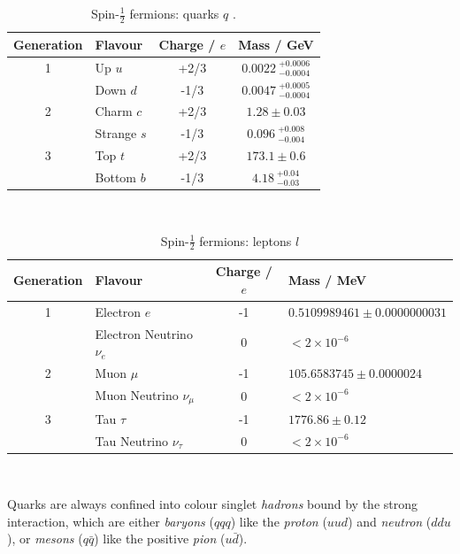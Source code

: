		{
		\setlength{\extrarowheight}{5pt}
		\begin{table}[ht]
			\caption[Properties of Spin-$\frac{1}{2}$ quarks]{Spin-$\frac{1}{2}$ fermions: quarks $q$ \cite{pdg}.}
			\label{t:tab:quark}
			\medskip
			\centering
			\begin{tabular}{clcc}\toprule
				Generation & Flavour & Charge / $e$ & Mass / GeV \\\midrule
				1    &     Up $u$      &    +2/3   & $0.0022\ _{-0.0004}^{+0.0006}$\\
	    &     Down $d$    &    -1/3   & $0.0047\ _{-0.0004}^{+0.0005}$\\
		    	2    &     Charm $c$      &    +2/3   & $1.28\pm0.03$\\
		    	&     Strange $s$    &    -1/3   & $0.096\ _{-0.004}^{+0.008}$\\
				3    &     Top $t$  &   +2/3   & $173.1\pm0.6$\\
	    &     Bottom $b$   &   -1/3   & $4.18\ _{-0.03}^{+0.04}$\\\bottomrule
			\end{tabular}\\[5pt]
		\end{table}
		}
		\begin{table}[ht]
			\caption[Properties of Spin-$\frac{1}{2}$ leptons]{Spin-$\frac{1}{2}$ fermions: leptons $l$ \cite{pdg}}
			\label{t:tab:lepton}
			\medskip
			\centering
			\begin{tabular}{clcl}\toprule
				Generation & Flavour & Charge / $e$ & Mass / MeV\\\midrule
				1    &     Electron $e$      &    -1   & $0.5109989461\pm0.0000000031$\\
				&     Electron Neutrino $\nu_e$    &   0  & $<2\times10^{-6}$ \\
				2    &     Muon $\mu$      &    -1   & $105.6583745\pm0.0000024$\\
				&     Muon Neutrino $\nu_\mu$    &    0   & $<2\times10^{-6}$ \\
				3    &     Tau $\tau$  &   -1   & $1776.86\pm0.12$\\
				&     Tau Neutrino $\nu_\tau$   &   0   & $<2\times10^{-6}$ \\\bottomrule
			\end{tabular}\\[5pt]
		\end{table}

		Quarks are always confined into colour singlet \textit{hadrons} bound by the strong interaction, which are either \textit{baryons} ($qqq$) like the \textit{proton} ($uud$) and \textit{neutron} ($ddu$), or \textit{mesons} ($q\bar{q}$) like the positive \textit{pion} ($u\bar{d}$).

